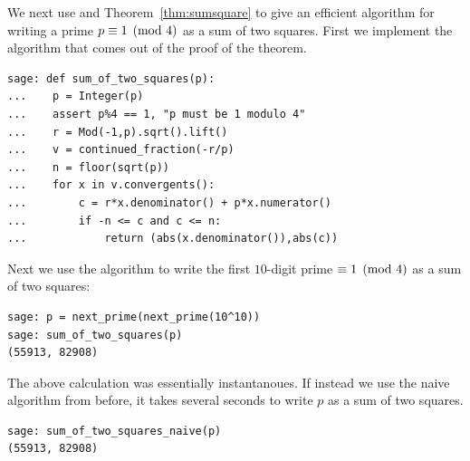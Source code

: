 \begin{sg}
We next use \sage and Theorem~\ref{thm:sumsquare} to
give an efficient algorithm for writing a prime $p\equiv 1\pmod{4}$
as a sum of two squares.  First we implement the algorithm
that comes out of the proof of the theorem.
\begin{verbatim}
sage: def sum_of_two_squares(p):
...    p = Integer(p)
...    assert p%4 == 1, "p must be 1 modulo 4"
...    r = Mod(-1,p).sqrt().lift()
...    v = continued_fraction(-r/p)
...    n = floor(sqrt(p))
...    for x in v.convergents():
...        c = r*x.denominator() + p*x.numerator()
...        if -n <= c and c <= n:
...            return (abs(x.denominator()),abs(c))
\end{verbatim}%
Next we use the algorithm to write the first $10$-digit
prime $\equiv 1\pmod{4}$ as a sum of two squares:
\begin{verbatim}
sage: p = next_prime(next_prime(10^10))
sage: sum_of_two_squares(p)
(55913, 82908)
\end{verbatim}%
The above calculation was essentially instantanoues.
If instead we use the naive algorithm from before,
it takes several seconds to write $p$ as a sum of two squares.
\begin{verbatim}
sage: sum_of_two_squares_naive(p)
(55913, 82908)
\end{verbatim}
\end{sg}


